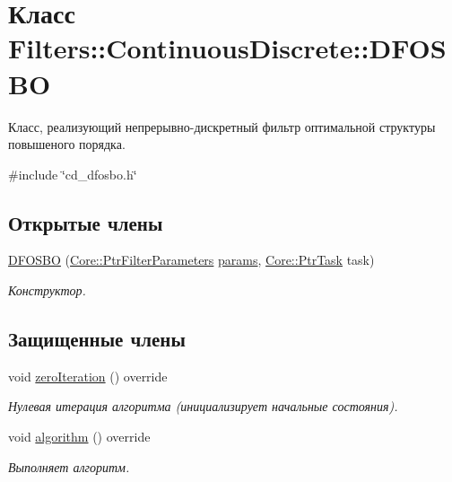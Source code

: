 \hypertarget{class_filters_1_1_continuous_discrete_1_1_d_f_o_s_b_o}{}\section{Класс Filters\+:\+:Continuous\+Discrete\+:\+:D\+F\+O\+S\+BO}
\label{class_filters_1_1_continuous_discrete_1_1_d_f_o_s_b_o}


Класс, реализующий непрерывно-\/дискретный фильтр оптимальной структуры повышеного порядка.  




{\ttfamily \#include \char`\"{}cd\+\_\+dfosbo.\+h\char`\"{}}

\subsection*{Открытые члены}
\begin{DoxyCompactItemize}
\item 
\hypertarget{class_filters_1_1_continuous_discrete_1_1_d_f_o_s_b_o_acadfa83ce71342e673d5cf954bda3cdc}{}\label{class_filters_1_1_continuous_discrete_1_1_d_f_o_s_b_o_acadfa83ce71342e673d5cf954bda3cdc} 
\hyperlink{class_filters_1_1_continuous_discrete_1_1_d_f_o_s_b_o_acadfa83ce71342e673d5cf954bda3cdc}{D\+F\+O\+S\+BO} (\hyperlink{namespace_core_a4811af8148ba137d644b9a61a042cf03}{Core\+::\+Ptr\+Filter\+Parameters} \hyperlink{class_core_1_1_filter_a44aa749b49ba46256975ce545531ecf7}{params}, \hyperlink{namespace_core_abfda8f69fcacfcea2696549b548ed737}{Core\+::\+Ptr\+Task} task)
\begin{DoxyCompactList}\small\item\em Конструктор. \end{DoxyCompactList}\end{DoxyCompactItemize}
\subsection*{Защищенные члены}
\begin{DoxyCompactItemize}
\item 
void \hyperlink{class_filters_1_1_continuous_discrete_1_1_d_f_o_s_b_o_a958c75df5031558a244d553f13376e75}{zero\+Iteration} () override
\begin{DoxyCompactList}\small\item\em Нулевая итерация алгоритма (инициализирует начальные состояния). \end{DoxyCompactList}\item 
void \hyperlink{class_filters_1_1_continuous_discrete_1_1_d_f_o_s_b_o_ab911983ab9ff8e22dc68e33fdb4601b6}{algorithm} () override
\begin{DoxyCompactList}\small\item\em Выполняет алгоритм. \end{DoxyCompactList}\end{DoxyCompactItemize}
